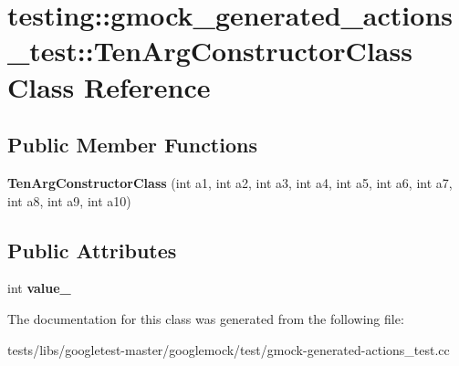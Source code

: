 \hypertarget{classtesting_1_1gmock__generated__actions__test_1_1TenArgConstructorClass}{}\section{testing\+:\+:gmock\+\_\+generated\+\_\+actions\+\_\+test\+:\+:Ten\+Arg\+Constructor\+Class Class Reference}
\label{classtesting_1_1gmock__generated__actions__test_1_1TenArgConstructorClass}
\subsection*{Public Member Functions}
\begin{DoxyCompactItemize}
\item 
\mbox{\label{classtesting_1_1gmock__generated__actions__test_1_1TenArgConstructorClass_ac17a2190151616f986a193dfe0a03cb5}} 
{\bfseries Ten\+Arg\+Constructor\+Class} (int a1, int a2, int a3, int a4, int a5, int a6, int a7, int a8, int a9, int a10)
\end{DoxyCompactItemize}
\subsection*{Public Attributes}
\begin{DoxyCompactItemize}
\item 
\mbox{\label{classtesting_1_1gmock__generated__actions__test_1_1TenArgConstructorClass_ae3c388fd7e3cfbb95196712076a368ad}} 
int {\bfseries value\+\_\+}
\end{DoxyCompactItemize}


The documentation for this class was generated from the following file\+:\begin{DoxyCompactItemize}
\item 
tests/libs/googletest-\/master/googlemock/test/gmock-\/generated-\/actions\+\_\+test.\+cc\end{DoxyCompactItemize}
